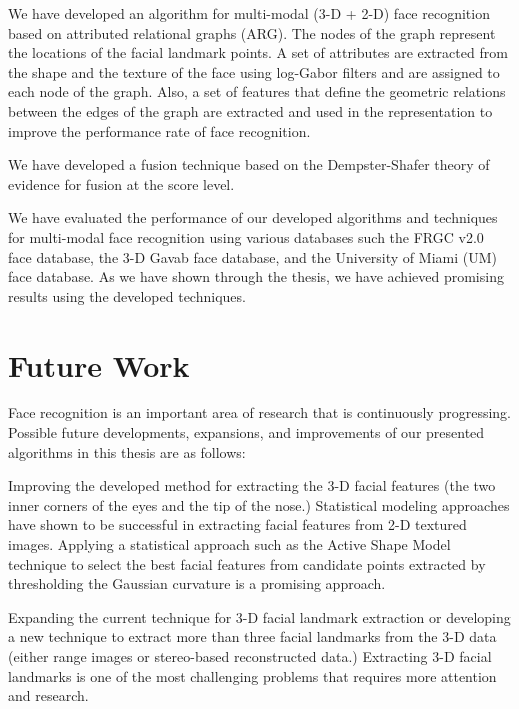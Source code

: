 \item
We have developed an algorithm for multi-modal (3-D + 2-D) face
recognition based on attributed relational graphs (ARG). The nodes
of the graph represent the locations of the facial landmark points.
A set of attributes are extracted from the shape and the texture of
the face using log-Gabor filters and are assigned to each node of
the graph. Also, a set of features that define the geometric
relations between the edges of the graph are extracted and used in
the representation to improve the performance rate of face
recognition.

\item We have developed a fusion technique based on the Dempster-Shafer theory
of evidence for fusion at the score level.

\item
We have evaluated the performance of our developed algorithms and
techniques for multi-modal face recognition using various databases
such the FRGC v2.0 face database, the 3-D Gavab face database, and
the University of Miami (UM) face database. As we have shown through
the thesis, we have achieved promising results using the developed
techniques.

\ei
\section{Future Work}
Face recognition is an important area of research that is
continuously progressing. Possible future developments, expansions,
and improvements of our presented algorithms in this thesis are as
follows:

\bi
\item
Improving the developed method for extracting the 3-D facial
features (the two inner corners of the eyes and the tip of the
nose.) Statistical modeling approaches have shown to be successful
in extracting facial features from 2-D textured images. Applying a
statistical approach such as the Active Shape Model technique to
select the best facial features from candidate points extracted by
thresholding the Gaussian curvature is a promising approach.

\item Expanding the current technique for 3-D facial landmark extraction or
developing a new technique to extract more than three facial
landmarks from the 3-D data (either range images or stereo-based
reconstructed data.) Extracting 3-D facial landmarks is one of the
most challenging problems that requires more attention and research.

